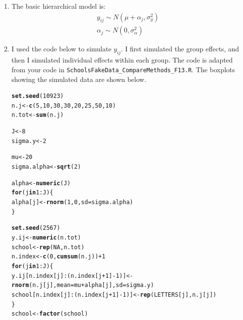 \documentclass[12pt]{article}\usepackage[]{graphicx}\usepackage[]{color}
\makeatletter
\newcommand{\hlnum}[1]{\textcolor[rgb]{0.686,0.059,0.569}{#1}}%
\newcommand{\hlopt}[1]{\textcolor[rgb]{0,0,0}{#1}}%
\newcommand{\hlstd}[1]{\textcolor[rgb]{0.345,0.345,0.345}{#1}}%
\newcommand{\hlkwa}[1]{\textcolor[rgb]{0.161,0.373,0.58}{\textbf{#1}}}%
\newcommand{\hlkwb}[1]{\textcolor[rgb]{0.69,0.353,0.396}{#1}}%
\newcommand{\hlkwc}[1]{\textcolor[rgb]{0.333,0.667,0.333}{#1}}%
\newcommand{\hlkwd}[1]{\textcolor[rgb]{0.737,0.353,0.396}{\textbf{#1}}}%
\newenvironment{kframe}{%
 \def\at@end@of@kframe{}%
 \ifinner\ifhmode%
  \def\at@end@of@kframe{\end{minipage}}%
  \begin{minipage}{\columnwidth}%
 \fi\fi%
 \def\FrameCommand##1{\hskip\@totalleftmargin \hskip-\fboxsep
 \colorbox{shadecolor}{##1}\hskip-\fboxsep
     \hskip-\linewidth \hskip-\@totalleftmargin \hskip\columnwidth}%
 \MakeFramed {\advance\hsize-\width
   \@totalleftmargin\z@ \linewidth\hsize
   \@setminipage}}%
 {\par\unskip\endMakeFramed%
 \at@end@of@kframe}
\newenvironment{knitrout}{}{} %
\makeatother
\begin{document}
\begin{doublespacing}
\begin{enumerate}
\begin{enumerate}
\begin{enumerate}
\end{enumerate}

\item The basic hierarchical model is:
\begin{align*}
y_{ij} \sim N(\mu+\alpha_j, \sigma^2_y) \\
\alpha_j \sim N(0, \sigma^2_{\alpha})
\end{align*}


\item I used the code below to simulate $y_{ij}$. I first simulated the group effects, and then I simulated individual effects within each group. The code is adapted from your code in \verb+SchoolsFakeData_CompareMethods_F13.R+. The boxplots showing the simulated data are shown below.

\begin{singlespace}
\begin{knitrout}\footnotesize
{}\color{fgcolor}\begin{kframe}
\begin{alltt}
\hlkwd{set.seed}\hlstd{(}\hlnum{10923}\hlstd{)}
 \hlstd{n.j} \hlkwb{<-} \hlkwd{c}\hlstd{(}\hlnum{5}\hlstd{,} \hlnum{10}\hlstd{,} \hlnum{30}\hlstd{,} \hlnum{30}\hlstd{,} \hlnum{20}\hlstd{,} \hlnum{25}\hlstd{,} \hlnum{50}\hlstd{,} \hlnum{10}\hlstd{)}
 \hlstd{n.tot} \hlkwb{<-} \hlkwd{sum}\hlstd{(n.j)}

 \hlstd{J} \hlkwb{<-} \hlnum{8}
 \hlstd{sigma.y} \hlkwb{<-} \hlnum{2}

 \hlstd{mu} \hlkwb{<-} \hlnum{20}
 \hlstd{sigma.alpha} \hlkwb{<-} \hlkwd{sqrt}\hlstd{(}\hlnum{2}\hlstd{)}

\hlstd{alpha} \hlkwb{<-} \hlkwd{numeric}\hlstd{(J)}
\hlkwa{for}\hlstd{(j} \hlkwa{in} \hlnum{1}\hlopt{:}\hlstd{J)\{}
  \hlstd{alpha[j]} \hlkwb{<-} \hlkwd{rnorm}\hlstd{(}\hlnum{1}\hlstd{,} \hlnum{0}\hlstd{,} \hlkwc{sd}\hlstd{=sigma.alpha)}
\hlstd{\}}

 \hlkwd{set.seed}\hlstd{(}\hlnum{2567}\hlstd{)}
 \hlstd{y.ij} \hlkwb{<-} \hlkwd{numeric}\hlstd{(n.tot)}
 \hlstd{school} \hlkwb{<-} \hlkwd{rep}\hlstd{(}\hlnum{NA}\hlstd{,n.tot)}
 \hlstd{n.index} \hlkwb{<-} \hlkwd{c}\hlstd{(}\hlnum{0}\hlstd{,} \hlkwd{cumsum}\hlstd{(n.j))} \hlopt{+}\hlnum{1}
 \hlkwa{for} \hlstd{(j} \hlkwa{in} \hlnum{1}\hlopt{:}\hlstd{J) \{}
   \hlstd{y.ij[n.index[j]}\hlopt{:}\hlstd{(n.index[j}\hlopt{+}\hlnum{1}\hlstd{]}\hlopt{-}\hlnum{1}\hlstd{)]} \hlkwb{<-} \hlkwd{rnorm}\hlstd{(n.j[j],} \hlkwc{mean}\hlstd{=mu}\hlopt{+}\hlstd{alpha[j],} \hlkwc{sd}\hlstd{=sigma.y)}
   \hlstd{school[n.index[j]}\hlopt{:}\hlstd{(n.index[j}\hlopt{+}\hlnum{1}\hlstd{]}\hlopt{-}\hlnum{1}\hlstd{)]} \hlkwb{<-} \hlkwd{rep}\hlstd{(LETTERS[j], n.j[j])}
 \hlstd{\}}
 \hlstd{school} \hlkwb{<-} \hlkwd{factor}\hlstd{(school)}
\end{alltt}
\end{kframe}
\end{knitrout}
\end{singlespace}


\end{enumerate}
\end{enumerate}
\end{doublespacing}
\end{document}
